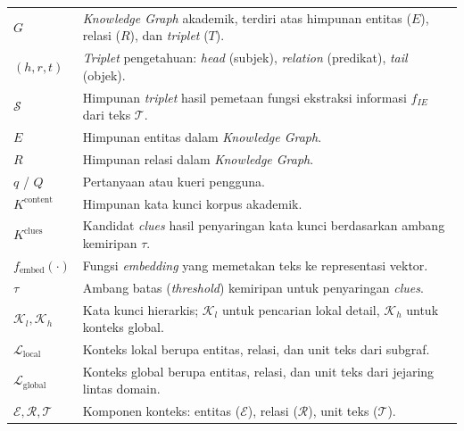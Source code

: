 \DaftarSimbol
\begin{longtable}{p{} p{}}
    $G$                                     & \textit{Knowledge Graph} akademik, terdiri atas himpunan entitas ($E$), relasi ($R$), dan \textit{triplet} ($T$).   \\
    $(h, r, t)$                             & \textit{Triplet} pengetahuan: \textit{head} (subjek), \textit{relation} (predikat), \textit{tail} (objek).          \\
    $\mathcal{S}$                           & Himpunan \textit{triplet} hasil pemetaan fungsi ekstraksi informasi $f_{IE}$ dari teks $\mathcal{T}$.               \\
    $E$                                     & Himpunan entitas dalam \textit{Knowledge Graph}.                                                                    \\
    $R$                                     & Himpunan relasi dalam \textit{Knowledge Graph}.                                                                     \\

    $q$ / $Q$                               & Pertanyaan atau kueri pengguna.                                                                                     \\
    $K^{\text{content}}$                    & Himpunan kata kunci korpus akademik.                                                                                \\
    $K^{\text{clues}}$                      & Kandidat \textit{clues} hasil penyaringan kata kunci berdasarkan ambang kemiripan $\tau$.                           \\
    $f_{\text{embed}}(\cdot)$               & Fungsi \textit{embedding} yang memetakan teks ke representasi vektor.                                               \\
    $\tau$                                  & Ambang batas (\textit{threshold}) kemiripan untuk penyaringan \textit{clues}.                                       \\
    $\mathcal{K}_l, \mathcal{K}_h$          & Kata kunci hierarkis; $\mathcal{K}_l$ untuk pencarian lokal detail, $\mathcal{K}_h$ untuk konteks global.           \\
    $\mathcal{L}_{\text{local}}$            & Konteks lokal berupa entitas, relasi, dan unit teks dari subgraf.                                                   \\
    $\mathcal{L}_{\text{global}}$           & Konteks global berupa entitas, relasi, dan unit teks dari jejaring lintas domain.                                   \\
    $\mathcal{E}, \mathcal{R}, \mathcal{T}$ & Komponen konteks: entitas ($\mathcal{E}$), relasi ($\mathcal{R}$), unit teks ($\mathcal{T}$).                       \\


\end{longtable}
